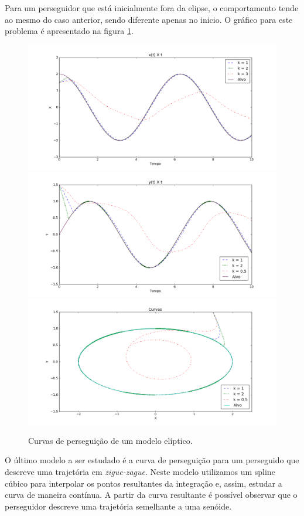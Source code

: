 \documentclass[a4paper,10pt]{article}
\begin{document}
  Para um perseguidor que está inicialmente fora da elipse, o comportamento tende ao mesmo do caso anterior, sendo diferente apenas no inicio. O gráfico para este problema é apresentado na figura \ref{fig:curva-el-1}.
  
  \begin{figure}[H]
   \includegraphics[scale=0.45]{el-1-X.png}
   \includegraphics[scale = 0.45]{el-1-Y.png}
   \includegraphics[width=\textwidth]{el-1-XY.png}
   \label{fig:curva-el-1}
   \caption{Curvas de perseguição de um modelo elíptico.}
  \end{figure}
  
  O último modelo a ser estudado é a curva de perseguição para um perseguido que descreve uma trajetória em \emph{zigue-zague}. Neste modelo utilizamos um spline cúbico para interpolar os pontos resultantes da integração e, assim, estudar a curva de maneira contínua. A partir da curva resultante é possível observar que o perseguidor descreve uma trajetória semelhante a uma senóide.
  
\end{document}
